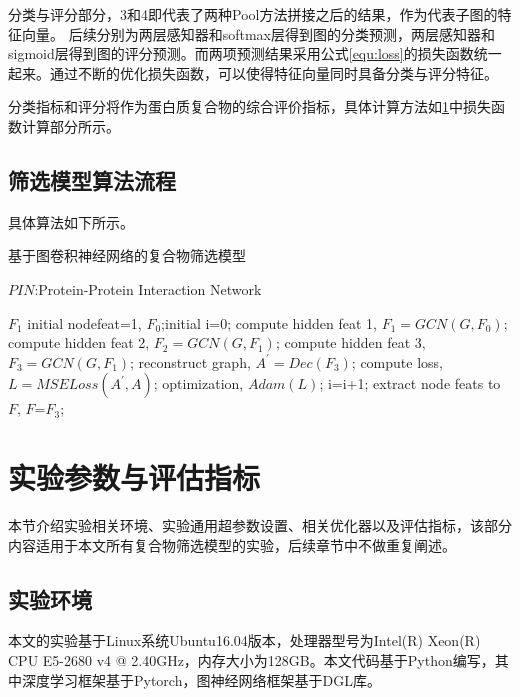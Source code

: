 分类与评分部分，3和4即代表了两种Pool方法拼接之后的结果，作为代表子图的特征向量。
后续分别为两层感知器和softmax层得到图的分类预测，两层感知器和sigmoid层得到图的评分预测。而两项预测结果采用公式\ref{equ:loss}的损失函数统一起来。通过不断的优化损失函数，可以使得特征向量同时具备分类与评分特征。

分类指标和评分将作为蛋白质复合物的综合评价指标，具体计算方法如\ref{section:NodeConv:allExperienceDesign}中损失函数计算部分所示。

\subsection{筛选模型算法流程}

具体算法如下所示。

\begin{algorithm}[h]
    \caption{基于图卷积神经网络的复合物筛选模型} %
    \label{alg::nodeconv}
    \begin{algorithmic}
        \Require
        $PIN$:Protein-Protein Interaction Network

        \Ensure
        $F_1$
        \State initial nodefeat=1, $F_0$;initial i=0;
        \Repeat
        \State compute hidden feat 1, $F_1=GCN(G,F_0)$;
        \State compute hidden feat 2, $F_2=GCN(G,F_1)$;
        \State compute hidden feat 3, $F_3=GCN(G,F_1)$;
        \State reconstruct graph, $A^{\prime}=Dec(F_3)$;
        \State compute loss, $L=MSELoss(A^{\prime},A)$;
        \State optimization, $Adam(L)$;
        \State i=i+1;
        \State extract node feats to $F$, $F$=$F_3$;
    \end{algorithmic}
\end{algorithm}

\section{实验参数与评估指标}
\label{section:NodeConv:allExperienceDesign}
本节介绍实验相关环境、实验通用超参数设置、相关优化器以及评估指标，该部分内容适用于本文所有复合物筛选模型的实验，后续章节中不做重复阐述。

\subsection{实验环境}
\label{subsection:allExperienceDesign:Environment}

本文的实验基于Linux系统Ubuntu16.04版本，处理器型号为Intel(R) Xeon(R) CPU E5-2680 v4 @ 2.40GHz，内存大小为128GB。本文代码基于Python编写，其中深度学习框架基于Pytorch，图神经网络框架基于DGL库\cite{wang_deep_2020}。

